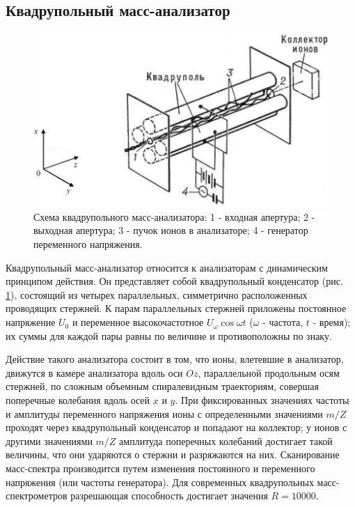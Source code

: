 \documentclass[a4paper, 12pt]{article}
\begin{document}
	\subsection{Квадрупольный масс-анализатор}
	\begin{figure}[h]
		\centering
		\includegraphics{quad.png}
		\caption{Схема квадрупольного масс-анализатора: 1 - входная апертура; 2 - выходная апертура; 3 - пучок ионов в анализаторе; 4 - генератор переменного напряжения.}
		\label{quad}
	\end{figure}\par
	Квадрупольный масс-анализатор относится к анализаторам с динамическим принципом действия. Он представляет собой квадрупольный конденсатор (рис. \ref{quad}), состоящий из четырех параллельных, симметрично расположенных проводящих стержней. К парам параллельных стержней приложены постоянное напряжение $U_0$ и переменное высокочастотное $U_\omega\cos\omega t$ ($\omega$ - частота, $t$ - время); их суммы для каждой пары равны по величине и противоположны по знаку.\par
	Действие такого анализатора состоит в том, что ионы, влетевшие в анализатор, движутся в камере анализатора вдоль оси $Oz$, параллельной продольным осям стержней, по сложным объемным спиралевидным траекториям, совершая поперечные колебания вдоль осей $x$ и $y$. При фиксированных значениях частоты и амплитуды переменного напряжения ионы с определенными значениями $m/Z$ проходят через квадрупольный конденсатор и попадают на коллектор; у ионов с другими значениями $m/Z$ амплитуда поперечных колебаний достигает такой величины, что они ударяются о стержни и разряжаются на них. Сканирование масс-спектра производится путем изменения постоянного и переменного напряжения (или частоты генератора). Для современных квадрупольных масс-спектрометров разрешающая способность достигает значения $R=10000$.
\end{document}
